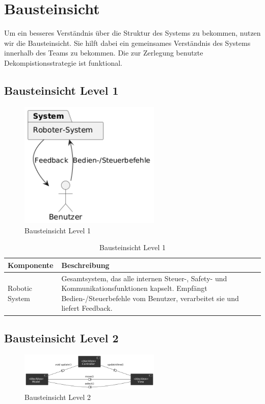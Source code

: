 \chapter{Bausteinsicht}

Um ein besseres Verständnis über die Struktur des Systems zu bekommen, nutzen wir die Bausteinsicht. Sie hilft dabei ein gemeinsames Verständnis des Systems innerhalb des Teams zu bekommen.
Die zur Zerlegung benutzte Dekompistionsstrategie ist funktional. 

\section{Bausteinsicht Level 1}
 

\begin{figure}[h] %
    \centering
    \includegraphics[width=0.6\textwidth]{diagrams/bausteinsicht_lvl_1_system_name_change.png}
    \caption{Bausteinsicht Level 1}
\end{figure}

\begin{table}[h!]
\centering
\begin{tabular}{|p{4cm}|p{9cm}|}
\hline
\textbf{Komponente} & \textbf{Beschreibung} \\ \hline
Robotic System & Gesamtsystem, das alle internen Steuer-, Safety- und Kommunikations­funktionen kapselt. Empfängt Bedien-/Steuerbefehle vom Benutzer, verarbeitet sie und liefert Feedback. \\ \hline
\end{tabular}
\caption{Bausteinsicht Level 1}
\label{tab:lvl1}
\end{table}

\newpage
\section{Bausteinsicht Level 2}
\begin{figure}[h] %
    \centering
    \includegraphics[width=0.6\textwidth]{diagrams/baustein_lvl_2_updated.png}
    \caption{Bausteinsicht Level 2}
\end{figure}

